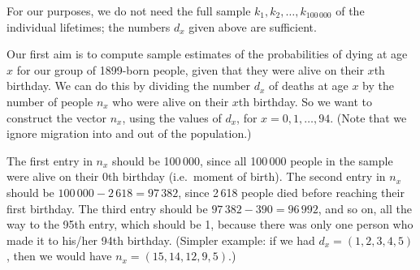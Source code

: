 \documentclass{article}
\begin{document}
For our purposes, we do not need the full sample $k_1, k_2, \ldots, k_{100\,000}$ of the individual lifetimes; the numbers $d_x$ given above are sufficient.

Our first aim is to compute sample estimates of the probabilities of dying at age $x$ for our group of 1899-born people, given that they were alive on their $x$th birthday. We can do this by dividing the number $d_x$ of deaths at age $x$ by the number of people $n_x$ who were alive on their $x$th birthday. So we want to construct the vector $n_x$, using the values of $d_x$, for $x = 0, 1, \ldots, 94$. (Note that we ignore migration into and out of the population.)

The first entry in $n_x$ should be 100\,000, since all 100\,000 people in the sample were alive on their 0th birthday (i.e.\ moment of birth). The second entry in $n_x$ should be $100\,000 - 2\,618 = 97\,382$, since 2\,618 people died before reaching their first birthday. The third entry should be $97\,382 - 390 = 96\,992$, and so on, all the way to the 95th entry, which should be 1, because there was only one person who made it to his/her 94th birthday. (Simpler example: if we had $d_x = (1, 2, 3, 4, 5)$, then we would have $n_x = (15, 14, 12, 9, 5)$.)
\end{document}
